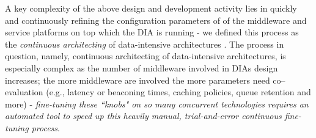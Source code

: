 A key complexity of the above design and development activity lies in quickly and continuously refining the configuration parameters of of the middleware and service platforms on top which the DIA is running - we defined this process as the \emph{continuous architecting} of data-intensive architectures \cite{wicsabd}. The process in question, namely, continuous architecting of data-intensive architectures, is especially complex as the number of middleware involved in DIAs design increases; the more middleware are involved the more parameters need co--evaluation (e.g., latency or beaconing times, caching policies, queue retention and more) - \emph{fine-tuning these ``knobs" on so many concurrent technologies requires an automated tool to speed up this heavily manual, trial-and-error continuous fine-tuning process}.

